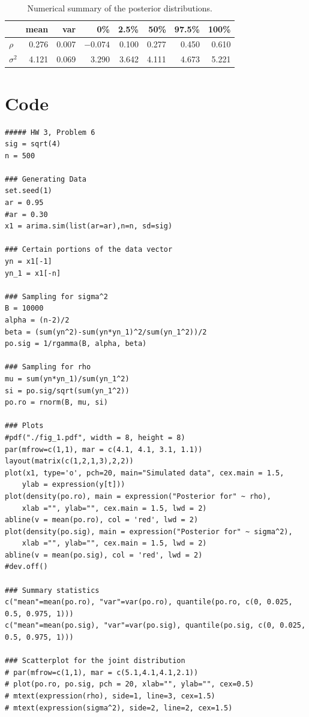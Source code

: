 \documentclass[12pt]{article}
\begin{document}
\begin{table}[H]
\begin{center}
\begin{tabular}{l|rrrrrrr}
           &  mean & var   & 0\%      & 2.5\% & 50\%  & 97.5\% & 100\% \\ \hline\hline
$\rho$     & 0.276 & 0.007 & $-0.074$ & 0.100 & 0.277 & 0.450  & 0.610 \\
$\sigma^2$ & 4.121 & 0.069 & 3.290    & 3.642 & 4.111 & 4.673  & 5.221 \\
\end{tabular}
\end{center}
\caption{Numerical summary of the posterior distributions.}
\end{table}

\newpage

\section*{Code}

\begin{footnotesize}
\begin{verbatim}
##### HW 3, Problem 6
sig = sqrt(4)
n = 500

### Generating Data
set.seed(1)
ar = 0.95
#ar = 0.30
x1 = arima.sim(list(ar=ar),n=n, sd=sig)

### Certain portions of the data vector
yn = x1[-1]
yn_1 = x1[-n]

### Sampling for sigma^2
B = 10000
alpha = (n-2)/2
beta = (sum(yn^2)-sum(yn*yn_1)^2/sum(yn_1^2))/2
po.sig = 1/rgamma(B, alpha, beta)

### Sampling for rho
mu = sum(yn*yn_1)/sum(yn_1^2)
si = po.sig/sqrt(sum(yn_1^2))
po.ro = rnorm(B, mu, si)

### Plots
#pdf("./fig_1.pdf", width = 8, height = 8)
par(mfrow=c(1,1), mar = c(4.1, 4.1, 3.1, 1.1))
layout(matrix(c(1,2,1,3),2,2))
plot(x1, type='o', pch=20, main="Simulated data", cex.main = 1.5,
    ylab = expression(y[t]))
plot(density(po.ro), main = expression("Posterior for" ~ rho),
    xlab ="", ylab="", cex.main = 1.5, lwd = 2)
abline(v = mean(po.ro), col = 'red', lwd = 2)
plot(density(po.sig), main = expression("Posterior for" ~ sigma^2),
    xlab ="", ylab="", cex.main = 1.5, lwd = 2)
abline(v = mean(po.sig), col = 'red', lwd = 2)
#dev.off()

### Summary statistics
c("mean"=mean(po.ro), "var"=var(po.ro), quantile(po.ro, c(0, 0.025, 0.5, 0.975, 1)))
c("mean"=mean(po.sig), "var"=var(po.sig), quantile(po.sig, c(0, 0.025, 0.5, 0.975, 1)))

### Scatterplot for the joint distribution
# par(mfrow=c(1,1), mar = c(5.1,4.1,4.1,2.1))
# plot(po.ro, po.sig, pch = 20, xlab="", ylab="", cex=0.5)
# mtext(expression(rho), side=1, line=3, cex=1.5)
# mtext(expression(sigma^2), side=2, line=2, cex=1.5)
\end{verbatim}
\end{footnotesize}
\end{document}
